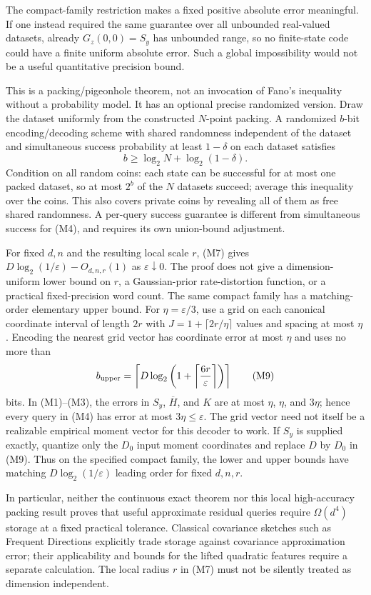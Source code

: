 The compact-family restriction makes a fixed positive absolute error
meaningful. If one instead required the same guarantee over all
unbounded real-valued datasets, already $G_z(0,0)=S_y$ has unbounded
range, so no finite-state code could have a finite uniform absolute
error. Such a global impossibility would not be a useful quantitative
precision bound.

This is a packing/pigeonhole theorem, not an invocation of Fano's
inequality without a probability model. It has an optional precise
randomized version. Draw the dataset uniformly from the constructed
$N$-point packing. A randomized $b$-bit encoding/decoding scheme with
shared randomness independent of the dataset and simultaneous
success probability at least $1-\delta$ on each dataset satisfies
\[
 b\ge\log_2N+\log_2(1-\delta).\tag{M8}
\]
Condition on all random coins: each state can be successful for at
most one packed dataset, so at most $2^b$ of the $N$ datasets
succeed; average this inequality over the coins. This also covers
private coins by revealing all of them as free shared randomness.
A per-query success guarantee is different from simultaneous
success for (M4), and requires its own union-bound adjustment.

For fixed $d,n$ and the resulting local scale $r$, (M7) gives
$D\log_2(1/\varepsilon)-O_{d,n,r}(1)$ as $\varepsilon\downarrow0$.
The proof does not give a dimension-uniform lower bound on $r$, a
Gaussian-prior rate-distortion function, or a practical fixed-precision
word count. The same compact family has a matching-order elementary
upper bound. For $\eta=\varepsilon/3$, use a grid on each canonical
coordinate interval of length $2r$ with
$J=1+\lceil2r/\eta\rceil$ values and spacing at most $\eta$.
Encoding the nearest grid vector has coordinate error at most $\eta$
and uses no more than
\[
 b_{\rm upper}=\left\lceil D\log_2\left(
                   1+\left\lceil\frac{6r}{\varepsilon}\right\rceil
                              \right)\right\rceil
 \tag{M9}
\]
bits. In (M1)--(M3), the errors in $S_y$, $\overline H$, and $K$ are
at most $\eta$, $\eta$, and $3\eta$; hence every query in (M4) has
error at most $3\eta\le\varepsilon$. The grid vector need not
itself be a realizable empirical moment vector for this decoder to
work. If $S_y$ is supplied exactly, quantize only the $D_0$ input
moment coordinates and replace $D$ by $D_0$ in (M9). Thus on the
specified compact family, the lower and upper bounds have matching
$D\log_2(1/\varepsilon)$ leading order for fixed $d,n,r$.

In particular, neither the continuous exact theorem nor this local
high-accuracy packing result proves that useful approximate residual
queries require $\Omega(d^4)$ storage at a fixed practical tolerance.
Classical covariance sketches such as Frequent Directions explicitly
trade storage against covariance approximation error\cite{p7ghashami2015}; their
applicability and bounds for the lifted quadratic features require a
separate calculation. The local radius $r$ in (M7) must not be silently
treated as dimension independent.

